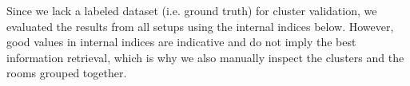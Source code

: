 

Since we lack a labeled dataset (i.e. ground truth) for cluster validation, we evaluated the results from all setups using the internal indices below. However, good values in internal indices are indicative and do not imply the best information retrieval, which is why we also manually inspect the clusters and the rooms grouped together.


